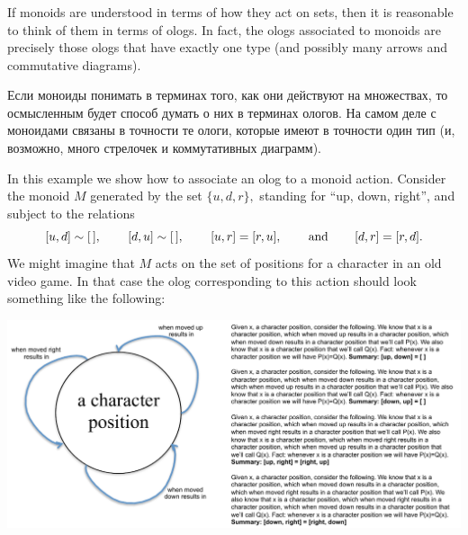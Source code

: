 \documentclass[../main/CT4S-EN-RU]{subfiles}
\begin{document}

\subsubsection{}

\begin{blockENG}
If monoids are understood in terms of how they act on sets, then it is reasonable to think of them in terms of ologs. In fact, the ologs associated to monoids are precisely those ologs that have exactly one type (and possibly many arrows and commutative diagrams).
\end{blockENG}

\begin{blockRUS}
Если моноиды понимать в терминах того, как они действуют на множествах, то осмысленным будет способ думать о них в терминах ологов. На самом деле с моноидами связаны в точности те ологи, которые имеют в точности один тип (и, возможно, много стрелочек и коммутативных диаграмм).
\end{blockRUS}

\begin{exampleENG}\label{ex:monoid as olog}
In this example we show how to associate an olog to a monoid action. Consider the monoid $M$ generated by the set $\{u,d,r\},$ standing for “up, down, right”, and subject to the relations $$[u,d]\sim[\,],\hspace{.3in}[d,u]\sim[\,],\hspace{.3in}[u,r]=[r,u],\hspace{.3in} \textnormal{and}\hspace{.3in} [d,r]=[r,d].$$
We might imagine that $M$ acts on the set of positions for a character in an old video game. In that case the olog corresponding to this action should look something like the following:
\begin{center}
\includegraphics[width=\textwidth]{monoidOlog}
\end{center}
\end{exampleENG}
\end{document}
